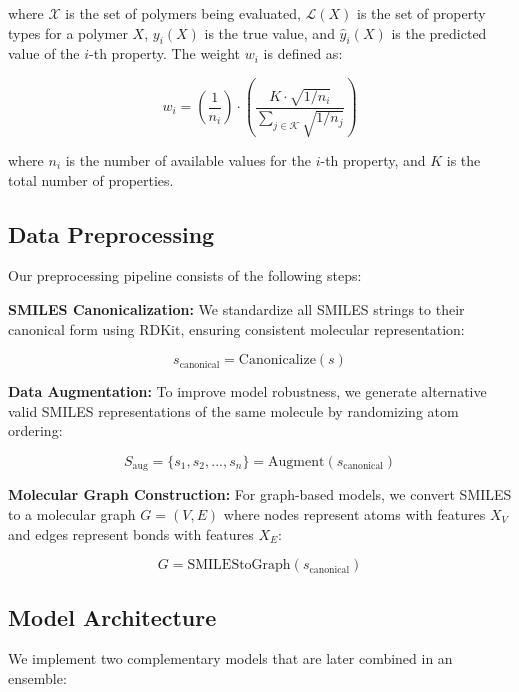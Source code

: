 \documentclass[10pt,twocolumn,letterpaper]{article}
\begin{document}
where $\mathcal{X}$ is the set of polymers being evaluated, $\mathcal{L}(X)$ is the set of property types for a polymer $X$, $y_i(X)$ is the true value, and $\hat{y}_i(X)$ is the predicted value of the $i$-th property. The weight $w_i$ is defined as:

\begin{equation}
w_i = \left(\frac{1}{n_i}\right) \cdot \left(\frac{K \cdot \sqrt{1/n_i}}{\sum_{j \in \mathcal{K}} \sqrt{1/n_j}}\right)
\end{equation}

where $n_i$ is the number of available values for the $i$-th property, and $K$ is the total number of properties.

\subsection{Data Preprocessing}

Our preprocessing pipeline consists of the following steps:

\textbf{SMILES Canonicalization:} We standardize all SMILES strings to their canonical form using RDKit, ensuring consistent molecular representation:

\begin{equation}
s_{\text{canonical}} = \text{Canonicalize}(s)
\end{equation}

\textbf{Data Augmentation:} To improve model robustness, we generate alternative valid SMILES representations of the same molecule by randomizing atom ordering:

\begin{equation}
S_{\text{aug}} = \{s_1, s_2, ..., s_n\} = \text{Augment}(s_{\text{canonical}})
\end{equation}

\textbf{Molecular Graph Construction:} For graph-based models, we convert SMILES to a molecular graph $G = (V, E)$ where nodes represent atoms with features $X_V$ and edges represent bonds with features $X_E$:

\begin{equation}
G = \text{SMILEStoGraph}(s_{\text{canonical}})
\end{equation}

\subsection{Model Architecture}

We implement two complementary models that are later combined in an ensemble:
\end{document}
